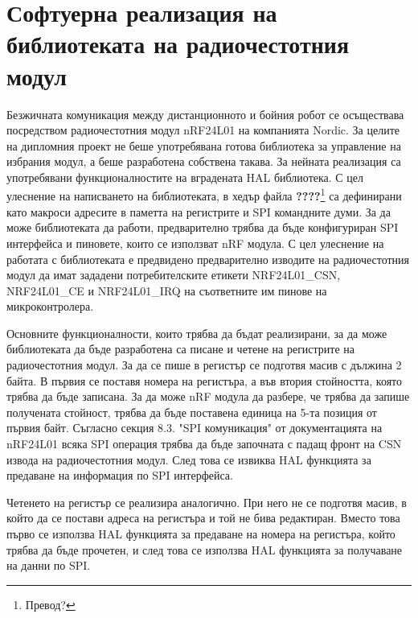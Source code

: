 \section{Софтуерна реализация на библиотеката на радиочестотния модул}
\label{sec:library}

Безжичната комуникация между дистанционното и бойния робот се осъществава посредством радиочестотния модул nRF24L01 на компанията Nordic. За целите на дипломния проект не беше употребявана готова библиотека за управление на избрания модул, а беше разработена собствена такава. За нейната реализация са употребявани функционалностите на вградената HAL библиотека. С цел улеснение на написването на библиотеката, в хедър файла \textbf{????}\footnote{Превод?} са дефинирани като макроси адресите в паметта на регистрите и SPI командните думи. За да може библиотеката да работи, предварително трябва да бъде конфигуриран SPI интерфейса и пиновете, които се използват nRF модула. С цел улеснение на работата с библиотеката е предвидено предварително изводите на радиочестотния модул да имат зададени потребителските етикети NRF24L01\_CSN, NRF24L01\_CE и NRF24L01\_IRQ на съответните им пинове на микроконтролера.

Основните функционалности, които трябва да бъдат реализирани, за да може библиотеката да бъде разработена са писане и четене на регистрите на радиочестотния модул. За да се пише в регистър се подготвя масив с дължина 2 байта. В първия се поставя номера на регистъра, а във втория стойността, която трябва да бъде записана. За да може nRF модула да разбере, че трябва да запише получената стойност, трябва да бъде поставена единица на 5-та позиция от първия байт. Съгласно секция 8.3. "SPI комуникация" от документацията на nRF24L01 всяка SPI операция трябва да бъде започната с падащ фронт на CSN извода на радиочестотния модул. След това се извиква HAL функцията за предаване на информация по SPI интерфейса.



Четенето на регистър се реализира аналогично. При него не се подготвя масив, в който да се постави адреса на регистъра и той не бива редактиран. Вместо това първо се използва HAL функцията за предаване на номера на регистъра, който трябва да бъде прочетен, и след това се използва HAL функцията за получаване на данни по SPI.




